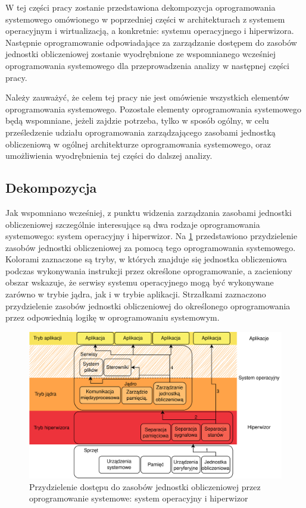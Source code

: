 \documentclass[../../main]{subfiles}
\begin{document}
W tej części pracy zostanie przedstawiona dekompozycja oprogramowania systemowego omówionego w poprzedniej części w architekturach z systemem operacyjnym i wirtualizacją, a konkretnie: systemu operacyjnego i hiperwizora. Następnie oprogramowanie odpowiadające za zarządzanie dostępem do zasobów jednostki obliczeniowej zostanie wyodrębnione ze wspomnianego wcześniej oprogramowania systemowego dla przeprowadzenia analizy w następnej części pracy.

Należy zauważyć, że celem tej pracy nie jest omówienie wszystkich elementów oprogramowania systemowego. Pozostałe elementy oprogramowania systemowego będą wspomniane, jeżeli zajdzie potrzeba, tylko w sposób ogólny, w celu prześledzenie udziału oprogramowania zarządzającego zasobami jednostką obliczeniową w ogólnej architekturze oprogramowania systemowego, oraz umożliwienia wyodrębnienia tej części do dalszej analizy. %

\subsection{Dekompozycja}

Jak wspomniano wcześniej, z punktu widzenia zarządzania zasobami jednostki obliczeniowej szczególnie interesujące są dwa rodzaje oprogramowania systemowego: system operacyjny i hiperwizor. Na \cref{fig:cpu-resources-mult} przedstawiono przydzielenie zasobów jednostki obliczeniowej za pomocą tego oprogramowania systemowego. Kolorami zaznaczone są tryby, w których znajduje się jednostka obliczeniowa podczas wykonywania instrukcji przez określone oprogramowanie, a zacieniony obszar wskazuje, że serwisy systemu operacyjnego mogą być wykonywane zarówno w trybie jądra, jak i w trybie aplikacji. Strzałkami zaznaczono przydzielenie zasobów jednostki obliczeniowej do określonego oprogramowania przez odpowiednią logikę w oprogramowaniu systemowym.

\begin{figure}[ht]
    \centering
    \includegraphics[width=\textwidth]{Images/cpu-resources-multiplexing.png}
    \caption{Przydzielenie dostępu do zasobów jednostki obliczeniowej przez oprogramowanie systemowe: system operacyjny i hiperwizor}
    \label{fig:cpu-resources-mult}
\end{figure}
\end{document}
